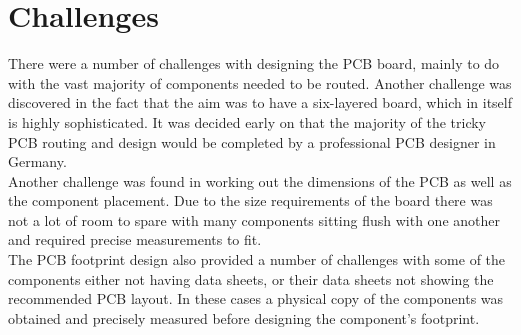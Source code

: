 \section{Challenges}

	There were a number of challenges with designing the PCB board, mainly to do with the vast majority of components needed to be routed. Another challenge was discovered in the fact that the aim was to have a six-layered board, which in itself is highly sophisticated. It was decided early on that the majority of the tricky PCB routing and design would be completed by a professional PCB designer in Germany.\\
Another challenge was found in working out the dimensions of the PCB as well as the component placement. Due to the size requirements of the board there was not a lot of room to spare with many components sitting flush with one another and required precise measurements to fit. \\
The PCB footprint design also provided a number of challenges with some of the components either not having data sheets, or their data sheets not showing the recommended PCB layout. In these cases a physical copy of the components was obtained and precisely measured before designing the component's footprint.











